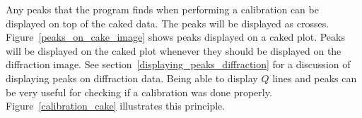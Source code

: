 Any peaks that the program finds when performing
a calibration can be displayed on top of the caked
data. The peaks will be displayed as crosses.
Figure~\ref{peaks_on_cake_image} shows peaks
displayed on a caked plot. Peaks will be displayed on 
the caked plot whenever they should be displayed on 
the diffraction image. See 
section~\ref{displaying_peaks_diffraction} for a
discussion of displaying peaks on diffraction data.
Being able to display $Q$ lines and peaks can
be very useful for checking if a calibration was 
done properly. Figure~\ref{calibration_cake} illustrates
this principle.

\begin{figure}[htb]
    \centering
    \;\;

\end{figure}
